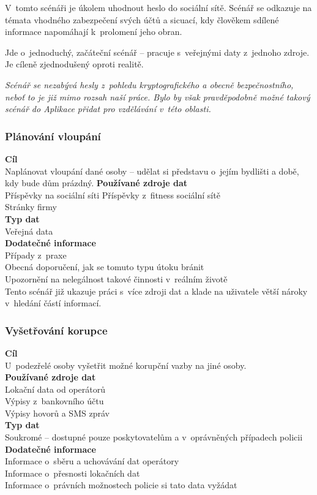 V~tomto scénáři je úkolem uhodnout heslo do sociální sítě. Scénář se odkazuje na témata vhodného zabezpečení svých účtů a sicuací, kdy člověkem sdílené informace napomáhají k~prolomení jeho obran.

Jde o~jednoduchý, začáteční scénář -- pracuje s~veřejnými daty z~jednoho zdroje. Je cíleně zjednodušený oproti realitě.

\textit{Scénář se nezabývá hesly z~pohledu kryptografického a obecně bezpečnostního, neboť to je již mimo rozsah naší práce. Bylo by však pravděpodobně možné takový scénář do Aplikace přidat pro vzdělávání v~této oblasti.}


\subsubsection*{Plánování vloupání}
\textbf{Cíl}\\
Naplánovat vloupání dané osoby -- udělat si představu o~jejím bydlišti a době, kdy bude dům prázdný.
\textbf{Používané zdroje dat}\\
Příspěvky na sociální síti
Příspěvky z~fitness sociální sítě\\
Stránky firmy\\
\textbf{Typ dat}\\
Veřejná data\\
\textbf{Dodatečné informace}\\
Případy z~praxe\\
Obecná doporučení, jak se tomuto typu útoku bránit\\ 
Upozornění na nelegálnost takové činnosti v~reálním životě\\

Tento scénář již ukazuje práci s~více zdroji dat a klade na uživatele větší nároky v~hledání částí informací.


\subsubsection*{Vyšetřování korupce}
\textbf{Cíl}\\
U~podezřelé osoby vyšetřit možné korupční vazby na jiné osoby.\\
\textbf{Používané zdroje dat}\\
Lokační data od operátorů\\
Výpisy z~bankovního účtu\\
Výpisy hovorů a SMS zpráv\\
\textbf{Typ dat}\\
Soukromé -- dostupné pouze poskytovatelům a v~oprávněných případech policii\\
\textbf{Dodatečné informace}\\
Informace o~sběru a uchovávání dat operátory\\
Informace o~přesnosti lokačních dat\\
Informace o~právních možnostech policie si tato data vyžádat\\



